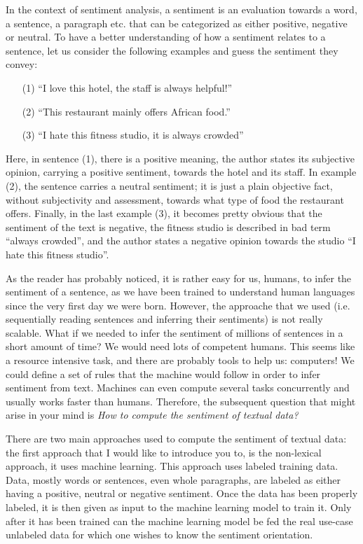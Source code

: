 	In the context of sentiment analysis, a sentiment is an evaluation towards a word, a sentence, a paragraph etc. that can be categorized as either positive, negative or neutral. To have a better understanding of how a sentiment relates to a sentence, let us consider the following examples and guess the sentiment they convey:
	\begin{enumerate}
	\item[(1)] ``I love this hotel, the staff is always helpful!''
	\item[(2)] ``This restaurant mainly offers African food.''
	\item[(3)] ``I hate this fitness studio, it is always crowded''
	\end{enumerate}

	Here, in sentence (1), there is a positive meaning, the author states its subjective opinion, carrying a positive sentiment, towards the hotel and its staff. In example (2), the sentence carries a neutral sentiment; it is just a plain objective fact, without subjectivity and assessment, towards what type of food the restaurant offers. Finally, in the last example (3), it becomes pretty obvious that the sentiment of the text is negative, the fitness studio is described in bad term ``always crowded'', and the author states a negative opinion towards the studio ``I hate this fitness studio''.

	As the reader has probably noticed, it is rather easy for us, humans, to infer the sentiment of a sentence, as we have been trained to understand human languages since the very first day we were born. However, the approache that we used (i.e. sequentially reading sentences and inferring their sentiments) is not really scalable. What if we needed to infer the sentiment of millions of sentences in a short amount of time? We would need lots of competent humans. This seems like a resource intensive task, and there are probably tools to help us: computers! We could define a set of rules that the machine would follow in order to infer sentiment from text. Machines can even compute several tasks concurrently and usually works faster than humans. Therefore, the subsequent question that might arise in your mind is \emph{How to compute the sentiment of textual data?}

	There are two main approaches used to compute the sentiment of textual data: the first approach that I would like to introduce you to, is the non-lexical approach, it uses machine learning. This approach uses labeled training data. Data, mostly words or sentences, even whole paragraphs, are labeled as either having a positive, neutral or negative sentiment. Once the data has been properly labeled, it is then given as input to the machine learning model to train it. Only after it has been trained can the machine learning model be fed the real use-case unlabeled data for which one wishes to know the sentiment orientation.

